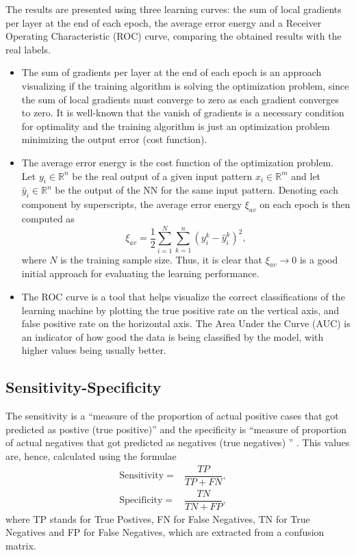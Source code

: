 \documentclass[conference]{IEEEtran}
\theoremstyle{definition}
\theoremstyle{remark}
\theoremstyle{remark}
\begin{document}
The results are presented using three learning curves: the sum of local
gradients per layer at the end of each epoch, the average error energy and a
Receiver Operating Characteristic (ROC) curve, comparing the obtained results
with the real labels.
\begin{itemize}
  \item The sum of gradients per layer at the end of each epoch is an approach
  visualizing if the training algorithm is solving the optimization problem,
  since the sum of local gradients must converge to zero as each gradient
  converges to zero. It is well-known that the vanish of gradients is a
  necessary condition for optimality and the training algorithm is just an
  optimization problem minimizing the output error (cost function).
  \item The average error energy is the cost function of the optimization
  problem. Let $y_i\in\mathbb{R}^n$ be the real output of a given input pattern
  $x_i\in\mathbb{R}^m$ and let $\hat{y}_i\in\mathbb{R}^n$ be the output of the
  NN for the same input pattern. Denoting each component by superscripts, the
  average error energy $\xi_{av}$ on each epoch is then computed as
\begin{equation}
\xi_{av}=\dfrac{1}{2}\sum_{i=1}^{N}\sum_{k=1}^n\left(y^k_i-\hat{y}^k_i\right)^2,
\end{equation}
  where $N$ is the training sample size. Thus, it is clear that
  $\xi_{av}\rightarrow0$ is a good initial approach for evaluating the
  learning performance.
  \item The ROC curve is a tool that helps visualize the correct classifications
  of the learning machine by plotting the true positive rate on the vertical
  axis, and false positive rate on the horizontal axis. The Area Under the Curve
  (AUC) is an indicator of how good the data is being classified by the model,
  with higher values being usually better.
\end{itemize}

\subsection{Sensitivity-Specificity}
The sensitivity is a ``measure of the proportion of actual positive cases that
got predicted as postive (true positive)'' and the specificity is ``measure of
proportion of actual negatives that got predicted as negatives (true negatives)
'' \parencite{sens}. This values are, hence, calculated using the formulae
\begin{align}
  \mathrm{Sensitivity}=&\dfrac{TP}{TP+FN},\quad
  \\\mathrm{Specificity} =&
  \dfrac{TN}{TN+FP},
\end{align}
where TP stands for True Postives, FN for False Negatives, TN for True Negatives
and FP for False Negatives, which are extracted from a confusion matrix.
\end{document}
